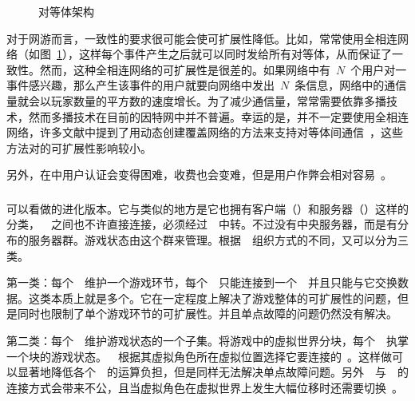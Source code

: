 \begin{figure}[htbp]
\begin{center}
\caption{对等体架构}
\label{P2P}
\end{center}
\end{figure}


对于{\pa}网游而言，一致性的要求很可能会使可扩展性降低。比如，{\pa}常常使用全相连网络（如图~\ref{P2P}），这样每个事件产生之后就可以同时发给所有对等体，从而保证了一致性。然而，这种全相连网络的可扩展性是很差的。如果网络中有~$N$~个用户对一事件感兴趣，那么产生该事件的用户就要向网络中发出~$N$~条信息，网络中的通信量就会以玩家数量的平方数的速度增长。为了减少通信量，{\pa}常常需要依靠多播技术，然而多播技术在目前的因特网中并不普遍。幸运的是，{\pa}并不一定要使用全相连网络，许多文献中提到了用动态创建覆盖网络的方法来支持对等体间通信~\cite{p2p1, p2p2}，这些方法对{\pa}的可扩展性影响较小。

另外，在{\pa}中用户认证会变得困难，收费也会变难，但是用户作弊会相对容易~\cite{cr}。

\subsubsection{\da}

{\da}可以看做{\csa}的进化版本。它与{\csa}类似的地方是它也拥有客户端（\ioc）和服务器（\gss）这样的分类，~\ioc~之间也不许直接连接，必须经过~\gss~中转。不过{\da}没有中央服务器，而是有分布的服务器群。游戏状态由这个群来管理。根据~\gss~组织方式的不同，{\da}又可以分为三类。

第一类：每个~\gss~维护一个游戏环节，每个~\ioc~只能连接到一个~\gss~并且只能与它交换数据。这类{\da}本质上就是多个{\csa}。它在一定程度上解决了游戏整体的可扩展性的问题，但是同时也限制了单个游戏环节的可扩展性。并且单点故障的问题仍然没有解决。

第二类：每个~\gss~维护游戏状态的一个子集。将游戏中的虚拟世界分块，每个~\gss~执掌一个块的游戏状态。~\ioc~根据其虚拟角色所在虚拟位置选择它要连接的~\gss。这样做可以显著地降低各个~\gss~的运算负担，但是同样无法解决单点故障问题。另外~\ioc~与~\gss~的连接方式会带来不公，且当虚拟角色在虚拟世界上发生大幅位移时还需要切换~\gss。


